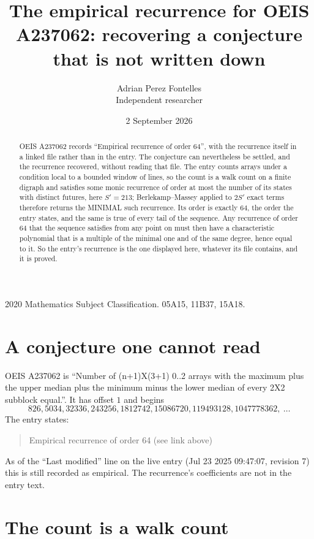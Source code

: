 \documentclass[11pt,a4paper]{article}
\title{The empirical recurrence for OEIS A237062: recovering a conjecture that is not written down}
\author{Adrian Perez Fontelles\\ \small Independent researcher}
\date{2 September 2026}
\theoremstyle{plain}
\theoremstyle{definition}
\begin{document}
\maketitle

\begin{abstract}
OEIS A237062 records ``Empirical recurrence of order $64$'', with the recurrence itself in a
linked file rather than in the entry. The conjecture can nevertheless be settled, and the
recurrence recovered, without reading that file. The entry counts arrays under a condition
local to a bounded window of lines, so the count is a walk count on a finite digraph and
satisfies some monic recurrence of order at most the number of its states with distinct
futures, here $S'=213$; Berlekamp--Massey applied to $2S'$ exact
terms therefore returns the MINIMAL such recurrence. Its order is exactly $64$, the order
the entry states, and the same is true of every tail of the sequence. Any recurrence of order
$64$ that the sequence satisfies from any point on must then have a characteristic
polynomial that is a multiple of the minimal one and of the same degree, hence equal to it. So
the entry's recurrence is the one displayed here, whatever its file contains, and it is
proved.
\end{abstract}

\noindent\small 2020 Mathematics Subject Classification. 05A15, 11B37, 15A18.\normalsize

\section{A conjecture one cannot read}

OEIS A237062 is ``Number of (n+1)X(3+1) 0..2 arrays with the maximum plus the upper median plus the minimum minus the lower median of every 2X2 subblock equal.''. It has offset $1$ and begins
\[
826, 5034, 32336, 243256, 1812742, 15086720, 119493128, 1047778362,\ \dots
\]
The entry states:
\begin{quote}
Empirical recurrence of order 64 (see link above)
\end{quote}
As of the ``Last modified'' line on the live entry (Jul 23 2025 09:47:07, revision 7) this is still
recorded as empirical. The recurrence's coefficients are not in the entry text.

\section{The count is a walk count}
\end{document}
